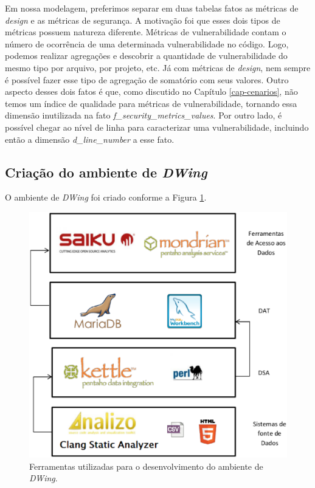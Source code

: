 Em nossa modelagem, preferimos separar em duas tabelas fatos as métricas de \emph{design} e as métricas de segurança. A motivação foi que esses dois tipos de métricas possuem natureza diferente. Métricas de vulnerabilidade contam o número de ocorrência de uma determinada vulnerabilidade no código. Logo, podemos realizar agregações e descobrir a quantidade de vulnerabilidade do mesmo tipo por arquivo, por projeto, etc. Já com métricas de \emph{design}, nem sempre é possível fazer esse tipo de agregação de somatório com seus valores. Outro aspecto desses dois fatos é que, como discutido no Capítulo \ref{cap-cenarios}, não temos um índice de qualidade para métricas de vulnerabilidade, tornando essa dimensão inutilizada na fato \emph{f\_security\_metrics\_values}. Por outro lado, é possível chegar ao nível de linha para caracterizar uma vulnerabilidade, incluindo então a dimensão \emph{d\_line\_number} a esse fato.



\subsection{Criação do ambiente de \emph{DWing}}

O ambiente de \emph{DWing} foi criado conforme a Figura \ref{dw_components}.

 \begin{figure}[H]
 	\centering
 		\includegraphics[scale=0.5]{figuras/dw_components}
 		\caption{Ferramentas utilizadas para o desenvolvimento do ambiente de \emph{DWing}.}
 		\label{dw_components}
 \end{figure}


